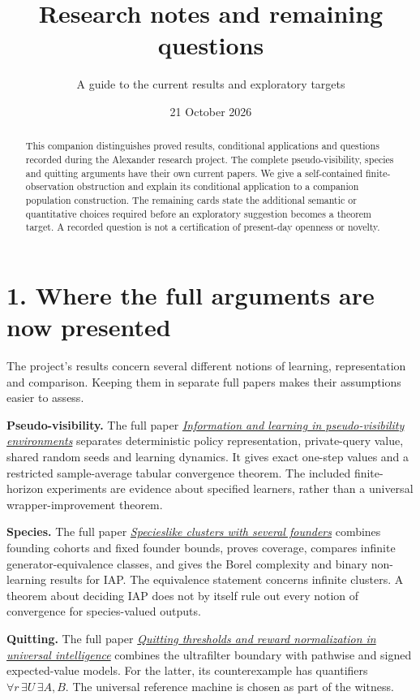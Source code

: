 \documentclass[
  11pt,
  letterpaper,
]{article}
\title{Research notes and remaining questions}
\subtitle{A guide to the current results and exploratory targets}
\author{}
\date{21 October 2026}
\begin{document}
\maketitle
\begin{abstract}
This companion distinguishes proved results, conditional applications
and questions recorded during the Alexander research project. The
complete pseudo-visibility, species and quitting arguments have their
own current papers. We give a self-contained finite-observation
obstruction and explain its conditional application to a companion
population construction. The remaining cards state the additional
semantic or quantitative choices required before an exploratory
suggestion becomes a theorem target. A recorded question is not a
certification of present-day openness or novelty.
\end{abstract}

\section{1. Where the full arguments are now
presented}\label{where-the-full-arguments-are-now-presented}

The project's results concern several different notions of learning,
representation and comparison. Keeping them in separate full papers
makes their assumptions easier to assess.

\textbf{Pseudo-visibility.} The full paper
\href{../12-pseudovisibility-private-information/pseudovisibility-private-information.pdf}{\emph{Information
and learning in pseudo-visibility environments}} separates deterministic
policy representation, private-query value, shared random seeds and
learning dynamics. It gives exact one-step values and a restricted
sample-average tabular convergence theorem. The included finite-horizon
experiments are evidence about specified learners, rather than a
universal wrapper-improvement theorem.

\textbf{Species.} The full paper
\href{../06-founding-cohort-species/founding-cohort-species.pdf}{\emph{Specieslike
clusters with several founders}} combines founding cohorts and fixed
founder bounds, proves coverage, compares infinite generator-equivalence
classes, and gives the Borel complexity and binary non-learning results
for IAP. The equivalence statement concerns infinite clusters. A theorem
about deciding IAP does not by itself rule out every notion of
convergence for species-valued outputs.

\textbf{Quitting.} The full paper
\href{../01-quitters-and-question-26/quitters.pdf}{\emph{Quitting
thresholds and reward normalization in universal intelligence}} combines
the ultrafilter boundary with pathwise and signed expected-value models.
For the latter, its counterexample has quantifiers
\(\forall r\,\exists U\,\exists A,B\). The universal reference machine
is chosen as part of the witness.
\end{document}
